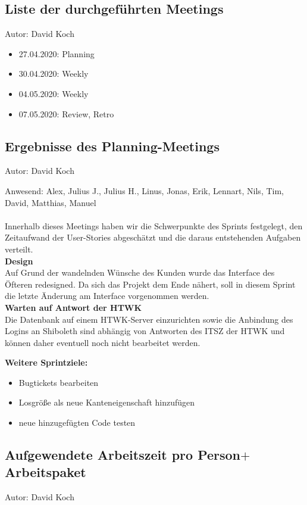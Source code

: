 \subsection{Liste der durchgeführten Meetings}
{\small Autor: David Koch}

\begin{itemize}
\item 27.04.2020: Planning
\item 30.04.2020: Weekly
\item 04.05.2020: Weekly
\item 07.05.2020: Review, Retro
\end{itemize}

\subsection{Ergebnisse des Planning-Meetings}
{\small Autor: David Koch}

Anwesend: Alex, Julius J., Julius H., Linus, Jonas, Erik, Lennart, Nils, Tim, David, Matthias, Manuel\\
\\
Innerhalb dieses Meetings haben wir die Schwerpunkte des Sprints festgelegt, den Zeitaufwand der User-Stories abgeschätzt und die daraus entstehenden Aufgaben verteilt.\\


\textbf{Design}\\
Auf Grund der wandelnden Wünsche des Kunden wurde das Interface des Öfteren redesigned. Da sich das Projekt dem Ende nähert, soll in diesem Sprint die letzte Änderung am Interface vorgenommen werden.\\

\textbf{Warten auf Antwort der HTWK}\\
Die Datenbank auf einem HTWK-Server einzurichten sowie die Anbindung des Logins an Shiboleth sind abhängig von Antworten des ITSZ der HTWK und können daher eventuell noch nicht bearbeitet werden.

\textbf{Weitere Sprintziele:}
\begin{itemize}
\item Bugtickets bearbeiten
\item Losgröße als neue Kanteneigenschaft hinzufügen
\item neue hinzugefügten Code testen
\end{itemize}


\subsection{Aufgewendete Arbeitszeit pro Person$+$Arbeitspaket}
{\small Autor: David Koch}

